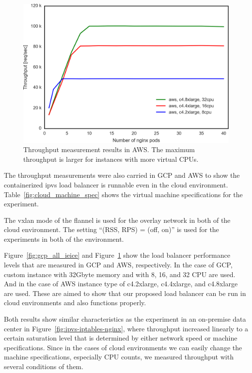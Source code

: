 \begin{figure}[h]
    \includegraphics[width=0.9\columnwidth]{Figs/aws_c4_ieice}
    \caption[Throughput measurement results in AWS]{
Throughput measurement results in AWS.
The maximum throughput is larger for instances with more virtual CPUs.
    }
    \label{fig:aws_c4_ieice}
\end{figure}

The throughput measurements were also carried in GCP and AWS to show the containerized ipvs load balancer is runnable even in the cloud environment.
Table~\ref{fig:cloud_machine_spec} shows the virtual machine specifications for the experiment.

The vxlan mode of the flannel is used for the overlay network in both of the cloud environment.
The setting \enquote{(RSS, RPS) = (off, on)} is used for the experiments in both of the environment.

Figure~\ref{fig:gcp_all_ieice} and Figure~\ref{fig:aws_c4_ieice} show the load balancer performance levels that are measured in GCP and AWS, respectively. In the case of GCP, custom instance with 32Gbyte memory and with 8, 16, and 32 CPU are used.
And in the case of AWS instance type of c4.2xlarge, c4.4xlarge, and c4.8xlarge are used.
These are aimed to show that our proposed load balancer can be run in cloud environments and also functions properly.

Both results show similar characteristics as the experiment in an on-premise data center in Figure~\ref{fig:ipvs-iptables-nginx}, where throughput increased linearly to a certain saturation level that is determined by either network speed or machine specifications.
Since in the cases of cloud environments we can easily change the machine specifications, especially CPU counts, we measured throughput with several conditions of them.

